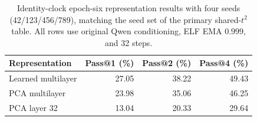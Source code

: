 \begin{table}[t]
\caption{Identity-clock epoch-six representation results with four seeds (42/123/456/789), matching the seed set of the primary shared-$t^2$ table. All rows use original Qwen conditioning, ELF EMA $0.999$, and 32 steps.}
\label{tab:identityfourseed}
\centering\small
\setlength{\tabcolsep}{4pt}
\begin{tabular}{lrrr}
\toprule
Representation & Pass@1 (\%) & Pass@2 (\%) & Pass@4 (\%) \\
\midrule
Learned multilayer & 27.05 & 38.22 & 49.43 \\
PCA multilayer & 23.98 & 35.06 & 46.25 \\
PCA layer 32 & 13.04 & 20.33 & 29.64 \\
\bottomrule
\end{tabular}
\end{table}
